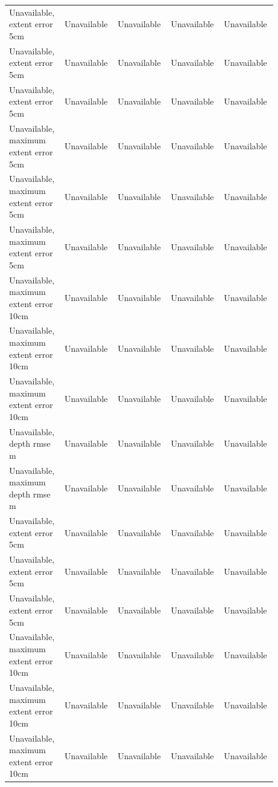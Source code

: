 \begin{longtable}{p{0.1760\linewidth}p{0.1760\linewidth}p{0.1760\linewidth}p{0.1760\linewidth}p{0.1760\linewidth}}
Unavailable, extent error 5cm & Unavailable & Unavailable & Unavailable & Unavailable \\
Unavailable, extent error 5cm & Unavailable & Unavailable & Unavailable & Unavailable \\
Unavailable, extent error 5cm & Unavailable & Unavailable & Unavailable & Unavailable \\
Unavailable, maximum extent error 5cm & Unavailable & Unavailable & Unavailable & Unavailable \\
Unavailable, maximum extent error 5cm & Unavailable & Unavailable & Unavailable & Unavailable \\
Unavailable, maximum extent error 5cm & Unavailable & Unavailable & Unavailable & Unavailable \\
Unavailable, maximum extent error 10cm & Unavailable & Unavailable & Unavailable & Unavailable \\
Unavailable, maximum extent error 10cm & Unavailable & Unavailable & Unavailable & Unavailable \\
Unavailable, maximum extent error 10cm & Unavailable & Unavailable & Unavailable & Unavailable \\
Unavailable, depth rmse m & Unavailable & Unavailable & Unavailable & Unavailable \\
Unavailable, maximum depth rmse m & Unavailable & Unavailable & Unavailable & Unavailable \\
Unavailable, extent error 5cm & Unavailable & Unavailable & Unavailable & Unavailable \\
Unavailable, extent error 5cm & Unavailable & Unavailable & Unavailable & Unavailable \\
Unavailable, extent error 5cm & Unavailable & Unavailable & Unavailable & Unavailable \\
Unavailable, maximum extent error 10cm & Unavailable & Unavailable & Unavailable & Unavailable \\
Unavailable, maximum extent error 10cm & Unavailable & Unavailable & Unavailable & Unavailable \\
Unavailable, maximum extent error 10cm & Unavailable & Unavailable & Unavailable & Unavailable \\
\end{longtable}
\endgroup
